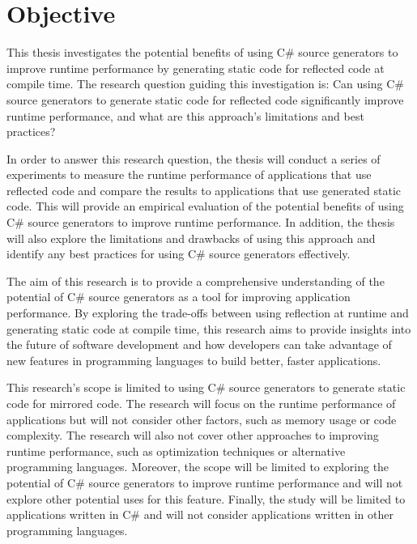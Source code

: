 \chapter{Objective}

This thesis investigates the potential benefits of using C# source generators to improve runtime performance by generating static code for reflected code at compile time. The research question guiding this investigation is: Can using C# source generators to generate static code for reflected code significantly improve runtime performance, and what are this approach's limitations and best practices?

In order to answer this research question, the thesis will conduct a series of experiments to measure the runtime performance of applications that use reflected code and compare the results to applications that use generated static code. This will provide an empirical evaluation of the potential benefits of using C# source generators to improve runtime performance. In addition, the thesis will also explore the limitations and drawbacks of using this approach and identify any best practices for using C# source generators effectively.

The aim of this research is to provide a comprehensive understanding of the potential of C# source generators as a tool for improving application performance. By exploring the trade-offs between using reflection at runtime and generating static code at compile time, this research aims to provide insights into the future of software development and how developers can take advantage of new features in programming languages to build better, faster applications.

This research's scope is limited to using C# source generators to generate static code for mirrored code. The research will focus on the runtime performance of applications but will not consider other factors, such as memory usage or code complexity. The research will also not cover other approaches to improving runtime performance, such as optimization techniques or alternative programming languages. Moreover, the scope will be limited to exploring the potential of C# source generators to improve runtime performance and will not explore other potential uses for this feature. Finally, the study will be limited to applications written in C# and will not consider applications written in other programming languages.